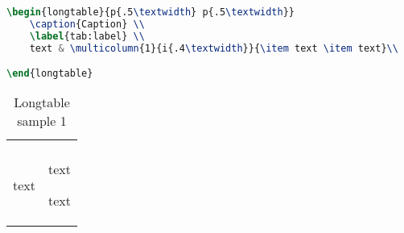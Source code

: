 \documentclass{article}
\begin{document}
\begin{lstlisting}[language=TeX, caption=Table sample 1]
\begin{longtable}{p{.5\textwidth} p{.5\textwidth}}
	\caption{Caption} \\
	\label{tab:label} \\
	text & \multicolumn{1}{i{.4\textwidth}}{\item text \item text}\\

\end{longtable}
\end{lstlisting}

\begin{longtable}{p{} p{}}
	\caption{Longtable sample 1} \\
	\label{tab:label} \\
	text & \multicolumn{1}{i{.4\textwidth}}{\item text \item text}\\

\end{longtable}

\end{document}
